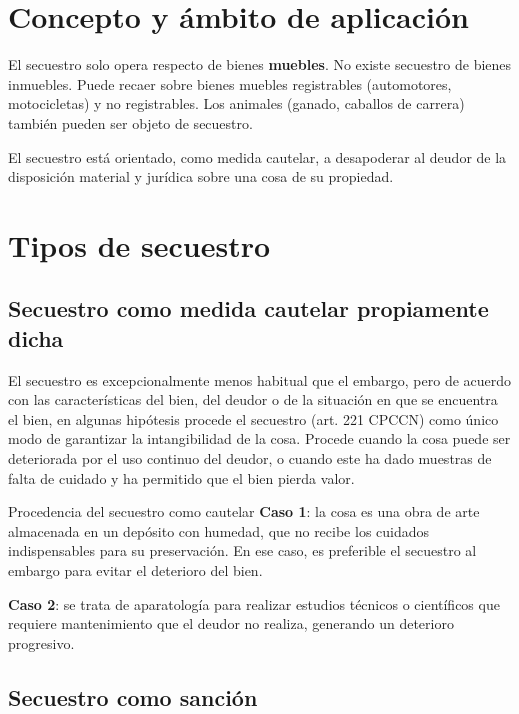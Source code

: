 \documentclass[12pt,oneside]{book}
\begin{document}
\section{Concepto y ámbito de aplicación}

\begin{important}
El secuestro solo opera respecto de bienes \textbf{muebles}. No existe secuestro de bienes inmuebles. Puede recaer sobre bienes muebles registrables (automotores, motocicletas) y no registrables. Los animales (ganado, caballos de carrera) también pueden ser objeto de secuestro.
\end{important}

El secuestro está orientado, como medida cautelar, a desapoderar al deudor de la disposición material y jurídica sobre una cosa de su propiedad.

\section{Tipos de secuestro}

\subsection{Secuestro como medida cautelar propiamente dicha}

El secuestro es excepcionalmente menos habitual que el embargo, pero de acuerdo con las características del bien, del deudor o de la situación en que se encuentra el bien, en algunas hipótesis procede el secuestro (art. 221 CPCCN) como único modo de garantizar la intangibilidad de la cosa. Procede cuando la cosa puede ser deteriorada por el uso continuo del deudor, o cuando este ha dado muestras de falta de cuidado y ha permitido que el bien pierda valor.

\begin{example}{Procedencia del secuestro como cautelar}
\textbf{Caso 1}: la cosa es una obra de arte almacenada en un depósito con humedad, que no recibe los cuidados indispensables para su preservación. En ese caso, es preferible el secuestro al embargo para evitar el deterioro del bien.

\textbf{Caso 2}: se trata de aparatología para realizar estudios técnicos o científicos que requiere mantenimiento que el deudor no realiza, generando un deterioro progresivo.
\end{example}

\subsection{Secuestro como sanción}
\end{document}
